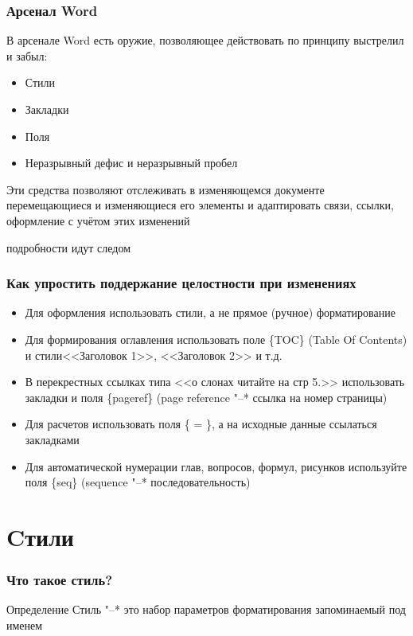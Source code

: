 \documentclass[10pt,pdf,hyperref={unicode}]{beamer}
\begin{document}
\begin{frame}
	\frametitle{Арсенал Word}
	В арсенале Word есть оружие, позволяющее действовать по принципу \alert{выстрелил и забыл}:
	\begin{itemize}
		\item Стили
		\item Закладки
		\item Поля 
		\item Неразрывный дефис и неразрывный пробел
	\end{itemize}
	Эти средства позволяют отслеживать в изменяющемся документе перемещающиеся и изменяющиеся его элементы и адаптировать связи, ссылки, оформление с учётом этих изменений 
	
\alert{подробности идут следом \textellipsis}
\end{frame}
\begin{frame}
	
	\frametitle{Как упростить поддержание целостности при изменениях}
	
	\begin{itemize}
		\item 	Для оформления использовать стили, а не прямое (ручное) форматирование  
		\item 	Для формирования оглавления использовать поле \{TOC\} (Table Of Contents) и стили<<Заголовок 1>>, <<Заголовок 2>> и т.д.
		\item 	В перекрестных ссылках типа <<о слонах читайте на стр 5.>> использовать закладки и поля \{pageref\} (page reference "--* ссылка на номер страницы)
		\item 	Для расчетов использовать поля \{ = \}, а на исходные данные ссылаться закладками
		\item Для автоматической нумерации глав, вопросов, формул, рисунков используйте поля \{seq\}  (sequence "--* последовательность)
	\end{itemize}
\end{frame}

\section{Cтили}
\begin{frame}
\frametitle{Что такое стиль?}
\begin{block}{Определение}
	Стиль "--* это набор параметров форматирования запоминаемый под именем
\end{block}

\end{frame}
\end{document}
